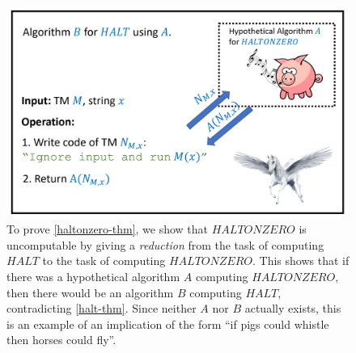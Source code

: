

\begin{figure}
\centering
\includegraphics[width=\textwidth, height=0.25\paperheight, keepaspectratio]{../figure/haltonzerored.png}
\caption{To prove \cref{haltonzero-thm}, we show that
\(\ensuremath{\mathit{HALTONZERO}}\) is uncomputable by giving a
\emph{reduction} from the task of computing
\(\ensuremath{\mathit{HALT}}\) to the task of computing
\(\ensuremath{\mathit{HALTONZERO}}\). This shows that if there was a
hypothetical algorithm \(A\) computing
\(\ensuremath{\mathit{HALTONZERO}}\), then there would be an algorithm
\(B\) computing \(\ensuremath{\mathit{HALT}}\), contradicting
\cref{halt-thm}. Since neither \(A\) nor \(B\) actually exists, this is
an example of an implication of the form ``if pigs could whistle then
horses could fly''.}
\label{haltonzerofig}
\end{figure}

